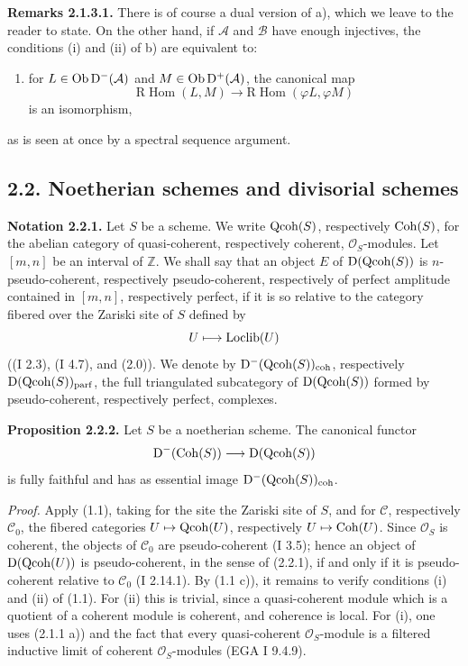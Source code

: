 \documentclass[11pt]{article}
\begin{document}
\textbf{Remarks 2.1.3.1.} There is of course a dual version of a), which we leave to the reader to state. On the other hand, if $\mathcal A$ and $\mathcal B$ have enough injectives, the conditions (i) and (ii) of b) are equivalent to:
\begin{enumerate}[label=(\roman*),start=3]
\item for $L\in\operatorname{Ob}\mathrm D^{-}(\mathcal A)$ and $M\in\operatorname{Ob}\mathrm D^{+}(\mathcal A)$, the canonical map
\[
\mathrm R\!\operatorname{Hom}(L,M)\longrightarrow
\mathrm R\!\operatorname{Hom}(\varphi L,\varphi M)
\]
is an isomorphism,
\end{enumerate}
as is seen at once by a spectral sequence argument.

\subsection*{2.2. Noetherian schemes and divisorial schemes}

\textbf{Notation 2.2.1.} Let $S$ be a scheme. We write $\operatorname{Qcoh}(S)$, respectively $\operatorname{Coh}(S)$, for the abelian category of quasi-coherent, respectively coherent, $\mathcal O_S$-modules. Let $[m,n]$ be an interval of $\mathbb Z$. We shall say that an object $E$ of $\mathrm D(\operatorname{Qcoh}(S))$ is $n$-pseudo-coherent, respectively pseudo-coherent, respectively of perfect amplitude contained in $[m,n]$, respectively perfect, if it is so relative to the category fibered over the Zariski site of $S$ defined by
\[
U\longmapsto \operatorname{Loclib}(U)
\]
((I 2.3), (I 4.7), and (2.0)). We denote by $\mathrm D^{-}(\operatorname{Qcoh}(S))_{\mathrm{coh}}$, respectively $\mathrm D(\operatorname{Qcoh}(S))_{\mathrm{parf}}$, the full triangulated subcategory of $\mathrm D(\operatorname{Qcoh}(S))$ formed by pseudo-coherent, respectively perfect, complexes.

\textbf{Proposition 2.2.2.} Let $S$ be a noetherian scheme. The canonical functor
\[
\mathrm D^{-}(\operatorname{Coh}(S))\longrightarrow \mathrm D(\operatorname{Qcoh}(S))
\]
is fully faithful and has as essential image $\mathrm D^{-}(\operatorname{Qcoh}(S))_{\mathrm{coh}}$.

\emph{Proof.} Apply (1.1), taking for the site the Zariski site of $S$, and for $\mathcal C$, respectively $\mathcal C_0$, the fibered categories $U\mapsto\operatorname{Qcoh}(U)$, respectively $U\mapsto\operatorname{Coh}(U)$. Since $\mathcal O_S$ is coherent, the objects of $\mathcal C_0$ are pseudo-coherent (I 3.5); hence an object of $\mathrm D(\operatorname{Qcoh}(U))$ is pseudo-coherent, in the sense of (2.2.1), if and only if it is pseudo-coherent relative to $\mathcal C_0$ (I 2.14.1). By (1.1 c)), it remains to verify conditions (i) and (ii) of (1.1). For (ii) this is trivial, since a quasi-coherent module which is a quotient of a coherent module is coherent, and coherence is local. For (i), one uses (2.1.1 a)) and the fact that every quasi-coherent $\mathcal O_S$-module is a filtered inductive limit of coherent $\mathcal O_S$-modules (EGA I 9.4.9).
\end{document}
